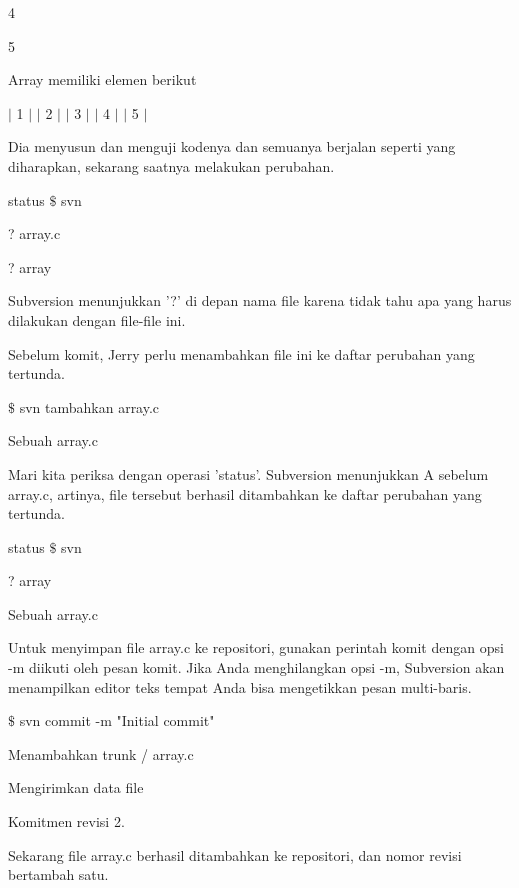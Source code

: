  \hspace*{0.5in} 4 \par
\noindent 
 \hspace*{0.5in} 5 \par
\noindent 
Array memiliki elemen berikut \par
\noindent 
 \hspace*{0.5in}  $  \vert  $ 1  $  \vert  $  $  \vert  $ 2  $  \vert  $  $  \vert  $ 3  $  \vert  $  $  \vert  $ 4  $  \vert  $  $  \vert  $ 5  $  \vert  $ \par
\noindent 
Dia menyusun dan menguji kodenya dan semuanya berjalan seperti yang diharapkan, sekarang saatnya melakukan perubahan. \par
\vspace{12pt}
 status  $  \$  $ svn \par
\noindent 
? array.c \par
\noindent 
? array \par
\noindent 
Subversion menunjukkan '?' di depan nama file karena tidak tahu apa yang harus dilakukan dengan file-file ini. \par
\vspace{12pt}
\noindent 
Sebelum komit, Jerry perlu menambahkan file ini ke daftar perubahan yang tertunda. \par
\vspace{12pt}
  $  \$  $ svn tambahkan array.c \par
\noindent 
Sebuah array.c \par
\noindent 
Mari kita periksa dengan operasi 'status'. Subversion menunjukkan A sebelum array.c, artinya, file tersebut berhasil ditambahkan ke daftar perubahan yang tertunda. \par
\vspace{12pt}
 status  $  \$  $ svn \par
\noindent 
? array \par
\noindent 
Sebuah array.c \par
\noindent 
Untuk menyimpan file array.c ke repositori, gunakan perintah komit dengan opsi -m diikuti oleh pesan komit. Jika Anda menghilangkan opsi -m, Subversion akan menampilkan editor teks tempat Anda bisa mengetikkan pesan multi-baris. \par
\vspace{12pt}
\vspace{12pt}
\vspace{12pt}
  $  \$  $ svn commit -m "Initial commit" \par
\noindent 
Menambahkan trunk / array.c \par
\noindent 
Mengirimkan data file \par
\noindent 
Komitmen revisi 2. \par
\noindent 
Sekarang file array.c berhasil ditambahkan ke repositori, dan nomor revisi bertambah satu. \par
\vspace{12pt}
\vspace{12pt}
\vspace{12pt}

